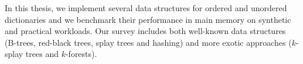 \documentclass[12pt,a4paper,twoside,openright]{report}
\begin{document}
In this thesis, we implement several data structures for ordered and unordered
dictionaries and we benchmark their performance in main memory on synthetic
and practical workloads. Our survey includes both well-known data structures
(B-trees, red-black trees, splay trees and hashing) and more exotic approaches
($k$-splay trees and $k$-forests).
\end{document}
